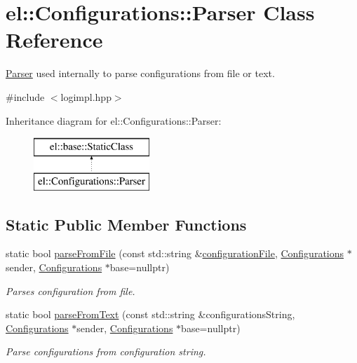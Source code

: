 \hypertarget{classel_1_1Configurations_1_1Parser}{\section{el\-:\-:Configurations\-:\-:Parser Class Reference}
\label{classel_1_1Configurations_1_1Parser}
}


\hyperlink{classel_1_1Configurations_1_1Parser}{Parser} used internally to parse configurations from file or text.  




{\ttfamily \#include $<$logimpl.\-hpp$>$}

Inheritance diagram for el\-:\-:Configurations\-:\-:Parser\-:\begin{figure}[H]
\begin{center}
\leavevmode
\includegraphics[height=2.000000cm]{classel_1_1Configurations_1_1Parser}
\end{center}
\end{figure}
\subsection*{Static Public Member Functions}
\begin{DoxyCompactItemize}
\item 
static bool \hyperlink{classel_1_1Configurations_1_1Parser_a45def5007bf368c4d2a505af58cd94c2}{parse\-From\-File} (const std\-::string \&\hyperlink{classel_1_1Configurations_a18df64bb5cd97bee672160290133141c}{configuration\-File}, \hyperlink{classel_1_1Configurations}{Configurations} $\ast$sender, \hyperlink{classel_1_1Configurations}{Configurations} $\ast$base=nullptr)
\begin{DoxyCompactList}\small\item\em Parses configuration from file. \end{DoxyCompactList}\item 
static bool \hyperlink{classel_1_1Configurations_1_1Parser_a39ec1b06f673e8155a83d66e08229129}{parse\-From\-Text} (const std\-::string \&configurations\-String, \hyperlink{classel_1_1Configurations}{Configurations} $\ast$sender, \hyperlink{classel_1_1Configurations}{Configurations} $\ast$base=nullptr)
\begin{DoxyCompactList}\small\item\em Parse configurations from configuration string. \end{DoxyCompactList}\end{DoxyCompactItemize}
